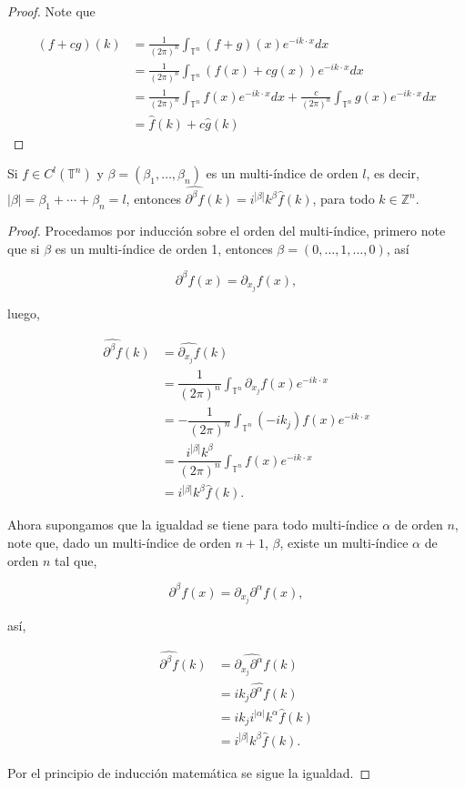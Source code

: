 \documentclass[12pt]{article}
\newcommand\T{\mathbb{T}}
\renewcommand{\hat}{\widehat}
\begin{document}
\begin{proof}
Note que

$$
\begin{aligned}
(f+c g)(k) & =\frac{1}{(2\pi)^n}\int_{\T^n}(f+g)(x) e^{-i k \cdot x} d x \\
& =\frac{1}{(2\pi)^n}\int_{\T^n}(f(x)+c g(x)) e^{-i k \cdot x} d x \\
& =\frac{1}{(2\pi)^n}\int_{\T^n} f(x) e^{-i k \cdot x} d x+\frac{c}{(2\pi)^n} \int_{\T^n} g(x) e^{-i k \cdot x} d x \\
& =\hat{f}(k)+c\hat{g}(k)
\end{aligned}
$$
\end{proof}

\begin{theorem}\label{derivadacacorra}
Si $f \in C^l\left(\mathbb{T}^n\right)$ y $\beta=\left(\beta_1, \ldots, \beta_n\right)$ es un multi-índice de orden $l$, es decir, $|\beta|=\beta_1+\cdots+\beta_n=l$, entonces $\widehat{\partial^\beta f}(k)=i^{|\beta|} k^\beta \widehat{f}(k)$, para todo $k \in \mathbb{Z}^n$.
\end{theorem}

\begin{proof}
Procedamos  por inducción sobre el orden del multi-índice, primero note que si $\beta$ es un multi-índice de orden 1, entonces $\beta=(0,\ldots,1,\ldots,0)$, así

$$\partial^{\beta}f(x)=\partial_{x_j}f(x),$$

luego,

\begin{align*}
    \widehat{\partial^{\beta}f}(k)&=\widehat{\partial_{x_j}f}(k)\\
    &=\dfrac{1}{(2\pi)^n}\int_{\T^n}\partial_{x_j}f(x)e^{-ik\cdot x}\\
    &=-\dfrac{1}{(2\pi)^n}\int_{\T^n}(-ik_j)f(x)e^{-ik\cdot x}\\
    &=\dfrac{i^{|\beta|}k^{\beta}}{(2\pi)^n}\int_{\T^n}f(x)e^{-ik\cdot x}\\
    &=i^{|\beta|}k^{\beta}\hat{f}(k)
.\end{align*}

Ahora supongamos que la igualdad se tiene para todo multi-índice $\alpha$ de orden $n$, note que, dado un multi-índice de orden $n+1$, $\beta$, existe un multi-índice $\alpha$ de orden $n$ tal que,

$$\partial^{\beta}f(x)=\partial_{x_j}\partial^{\alpha}f(x),$$

así,

\begin{align*}
    \widehat{\partial^{\beta}f}(k)&=\widehat{\partial_{x_j}\partial^{\alpha}f}(k)\\
    &=ik_j\widehat{\partial^{\alpha}f}(k)\\
    &=ik_ji^{|\alpha|}k^{\alpha}\hat{f}(k)\\
    &=i^{|\beta|}k^{\beta}\hat{f}(k)
.\end{align*}

Por el principio de inducción matemática se sigue la igualdad.

\end{proof}
\end{document}
